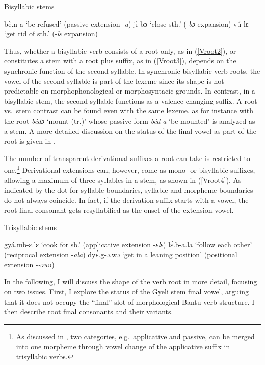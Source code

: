 \begin{exe}
\ex\label{Vroot3} Bisyllabic stems
\begin{xlist}
\ex  bè.n-a `be refused' (passive extension -{\itshape a}) 
\ex\label{Vroot3b} jì-bɔ `close sth.' (-{\itshape bɔ} expansion)
\ex\label{Vroot3c} vú-lɛ `get rid of sth.' (-{\itshape lɛ} expansion)
\end{xlist}
\end{exe}

Thus, whether a bisyllabic verb consists of a root only, as in (\ref{Vroot2}), or constitutes a stem with a root plus suffix, as in (\ref{Vroot3}), depends on the synchronic function of the second syllable.   In synchronic bisyllabic verb roots, the vowel of the second syllable is part of the lexeme since its shape is not predictable on morphophonological or morphosyntacic grounds. In contrast, in a bisyllabic stem, the second syllable functions as a valence changing suffix. A root vs.\ stem contrast can be found even with the same lexeme, as for instance with the root {\itshape bédɔ} `mount (tr.)' whose passive form {\itshape béd-a} `be mounted' is analyzed as a stem.
A more detailed discussion on the status of the final vowel as part of the root is given in .

The number of transparent derivational suffixes a root can take is restricted to one.\footnote{As discussed in , two categories, e.g.\ applicative and passive, can be merged into one morpheme through vowel change of the applicative suffix in trisyllabic verbs.} Derivational extensions can, however, come as mono- or bisyllabic suffixes, allowing a maximum of three syllables in a stem, as shown in (\ref{Vroot4}). As indicated by the dot for syllable boundaries, syllable and morpheme boundaries do not always coincide. In fact, if the derivation suffix starts with a vowel, the root final consonant gets resyllabified as the onset of the extension vowel.

\begin{exe}
\ex\label{Vroot4} Trisyllabic stems
\begin{xlist}
\ex  gyá.mb-ɛ.lɛ `cook for sb.' (applicative extension -{\itshape ɛlɛ}) 
\ex lɛ̀.b-a.la `follow each other' (reciprocal extension -{\itshape ala})
\ex dyɛ́.g-ɔ.wɔ `get in a leaning position' (positional extension -{\itshape -ɔwɔ})
\end{xlist}
\end{exe}

In the following, I will discuss the shape of the verb root in more detail, focusing on two issues. First, I explore the status of the Gyeli stem final vowel, arguing that it does not occupy the ``final'' slot of  morphological Bantu verb structure. I then describe root final consonants and their variants.




